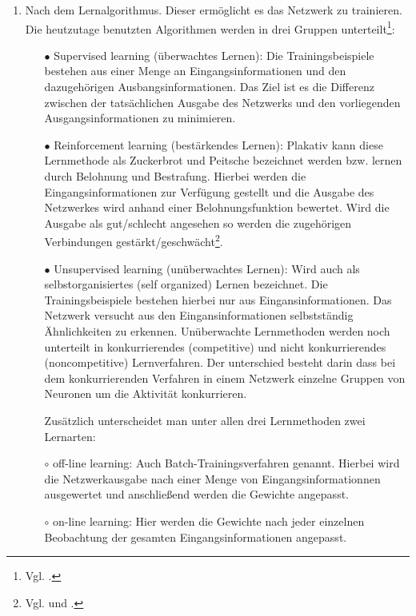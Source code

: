 \begin{enumerate}
\begin{itemize}
\end{itemize}

\item%
Nach dem Lernalgorithmus. Dieser ermöglicht es das Netzwerk zu trainieren. Die heutzutage benutzten Algorithmen werden in drei Gruppen unterteilt\footnote{Vgl. \citet[55]{dkriesel07}.\label{kriesel55}}:

\begin{itemize}
\item[\textbf{$\bullet$}]%
Supervised learning (überwachtes Lernen): Die Trainingsbeispiele bestehen aus einer Menge an Eingangsinformationen und den dazugehörigen Ausbangsinformationen. Das Ziel ist es die Differenz zwischen der tatsächlichen Ausgabe des Netzwerks und den vorliegenden Ausgangsinformationen zu minimieren.

\item[\textbf{$\bullet$}]%
Reinforcement learning (bestärkendes Lernen): Plakativ kann diese Lernmethode als Zuckerbrot und Peitsche bezeichnet werden bzw. lernen durch Belohnung und Bestrafung. Hierbei werden die Eingangsinformationen zur Verfügung gestellt und die Ausgabe des Netzwerkes wird anhand einer Belohnungsfunktion bewertet. Wird die Ausgabe als gut/schlecht angesehen so werden die zugehörigen Verbindungen gestärkt/geschwächt\footnote{Vgl. \citet[201]{dkriesel07} und \citet[A2.3:5]{Fiesler96}.}. 

\item[\textbf{$\bullet$}]%
Unsupervised learning (unüberwachtes Lernen): Wird auch als selbstorganisiertes (self organized) Lernen bezeichnet. Die Trainingsbeispiele bestehen hierbei nur aus Eingansinformationen. Das Netzwerk versucht aus den Eingansinformationen selbstständig Ähnlichkeiten zu erkennen.
Unüberwachte Lernmethoden werden noch unterteilt in konkurrierendes (competitive) und nicht konkurrierendes (noncompetitive) Lernverfahren. Der unterschied besteht darin dass bei dem konkurrierenden Verfahren in einem Netzwerk einzelne Gruppen von Neuronen um die Aktivität konkurrieren.

Zusätzlich unterscheidet man unter allen drei Lernmethoden zwei Lernarten: 
\item[$\circ$]%
off-line learning: Auch Batch-Trainingsverfahren genannt. Hierbei wird die Netzwerkausgabe nach einer Menge von Eingangsinformationnen ausgewertet und anschließend werden die Gewichte angepasst.

\item[$\circ$]%
on-line learning: Hier werden die Gewichte nach jeder einzelnen Beobachtung der gesamten Eingangsinformationen angepasst. 

\end{itemize}

\end{enumerate}

